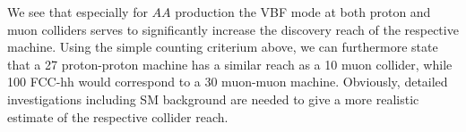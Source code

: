We see that especially for $AA$ production the VBF mode at both proton and muon  colliders serves to significantly increase the discovery reach of the respective machine. Using the simple counting criterium above, we can furthermore state that a 27 \TeV proton-proton machine has a similar reach as a 10 \TeV muon collider, while 100 \TeV FCC-hh would correspond to a 30 \TeV muon-muon machine. Obviously, detailed investigations including SM background are needed to give a more realistic estimate of the respective collider reach.
